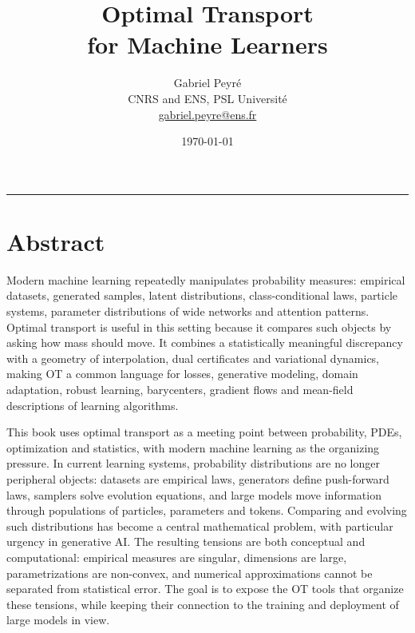 \documentclass[10pt,a4paper,twoside,openany]{book}
\title{Optimal Transport\\for Machine Learners}
\author{%
\begin{tabular}{c}
	Gabriel Peyr{\'e} \\ CNRS and ENS, PSL Universit\'e \\
	 \url{gabriel.peyre@ens.fr}
\end{tabular}
}
\date{\today}
\makeatletter
\renewcommand{\cleardoublepage}{%
	\clearpage
	\if@twoside
		\ifodd\c@page
		\else
			\hbox{}\thispagestyle{empty}\newpage
			\if@twocolumn\hbox{}\newpage\fi
		\fi
	\fi
}
\renewcommand{\maketitle}{%
\begin{titlepage}
\thispagestyle{empty}
\centering
\vspace*{.18\textheight}
{\fontsize{44}{50}\selectfont\bfseries\color{otblue}\@title\par}
\vspace{1.35cm}
{\Large\@author\par}
\vfill
{\color{otred}\rule{.32\textwidth}{2pt}}\par
\vspace{.65cm}
{\large\@date\par}
\vspace*{.08\textheight}
\end{titlepage}
}
\makeatother
\begin{document}
\hypersetup{pageanchor=false}
\maketitle
\cleardoublepage
\hypersetup{pageanchor=true}

\frontmatter

\chapter*{Abstract}
Modern machine learning repeatedly manipulates probability measures: empirical datasets, generated samples, latent distributions, class-conditional laws, particle systems, parameter distributions of wide networks and attention patterns. Optimal transport is useful in this setting because it compares such objects by asking how mass should move. It combines a statistically meaningful discrepancy with a geometry of interpolation, dual certificates and variational dynamics, making OT a common language for losses, generative modeling, domain adaptation, robust learning, barycenters, gradient flows and mean-field descriptions of learning algorithms.

This book uses optimal transport as a meeting point between probability, PDEs, optimization and statistics, with modern machine learning as the organizing pressure. In current learning systems, probability distributions are no longer peripheral objects: datasets are empirical laws, generators define push-forward laws, samplers solve evolution equations, and large models move information through populations of particles, parameters and tokens. Comparing and evolving such distributions has become a central mathematical problem, with particular urgency in generative AI\@. The resulting tensions are both conceptual and computational: empirical measures are singular, dimensions are large, parametrizations are non-convex, and numerical approximations cannot be separated from statistical error. The goal is to expose the OT tools that organize these tensions, while keeping their connection to the training and deployment of large models in view.
\end{document}
